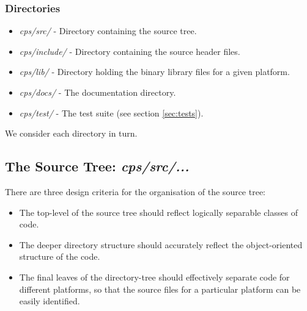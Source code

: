 \documentclass[12pt]{article}
\begin{document}
\subsubsection{Directories}
\begin{itemize}
\setlength{\itemsep}{0.0cm}
 \item \emph{cps/src/} - Directory containing the source tree.
 \item \emph{cps/include/} - Directory containing the source header files.
 \item \emph{cps/lib/} - Directory holding the binary library files for a given platform.
 \item \emph{cps/docs/} - The documentation directory.
 \item \emph{cps/test/} - The test suite (see section \ref{sec:tests}).
\end{itemize}

We consider each directory in turn.

\subsection{The Source Tree: \emph{cps/src/...}}
There are three design criteria for the organisation of the source tree:
\begin{itemize}
\setlength{\itemsep}{0.0cm}
\item The top-level of the source tree should reflect logically separable
classes of code.
\item The deeper directory structure should accurately reflect the
object-oriented structure of the code.
\item The final leaves of the directory-tree should effectively separate code
for different platforms, so that the source files for a particular platform can be
easily identified.
\end{itemize}
\end{document}
